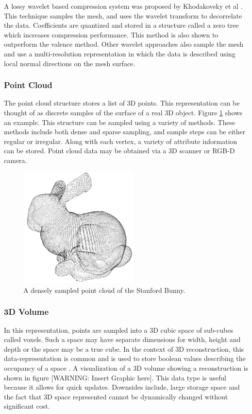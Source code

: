 A lossy wavelet based compression system was proposed by Khodakovsky et al \cite{Khodakovsky00Progressive}. This technique samples the mesh, and uses the wavelet transform to decorrelate the data. Coefficients are quantized and stored in a structure called a zero tree which increases compression performance. This method is also shown to outperform the valence method. Other wavelet approaches \cite{Guskov00Normal,Khodakovsky04Normalmesh} also sample the mesh and use a multi-resolution representation in which the data is described using local normal directions on the mesh surface. \\


\subsubsection{Point Cloud}

The point cloud structure stores a list of 3D points. This representation can be thought of as discrete samples of the surface of a real 3D object. Figure \ref{PointCloudExample} shows an example. This structure can be sampled using a variety of methods. These methods include both dense and sparse sampling, and sample steps can be either regular or irregular. Along with each vertex, a variety of attribute information can be stored. Point cloud data may be obtained via a 3D scanner or RGB-D camera. 

\begin{figure}[!h]
\centering
\includegraphics[width=6cm]{images/ch2/PointCloudExample}
\caption{A densely sampled point cloud of the Stanford Bunny.}
\label{PointCloudExample}
\end{figure}


\subsubsection{3D Volume}

In this representation, points are sampled into a 3D cubic space of sub-cubes called voxels. Such a space may have separate dimensions for width, height and depth or the space may be a true cube. In the context of 3D reconstruction, this data-representation is common and is used to store boolean values describing the occupancy of a space \cite{Rusinkiewicz02Real}. A visualization of a 3D volume showing a reconstruction is shown in figure [WARNING: Insert Graphic here]. This data type is useful because it allows for quick updates. Downsides include, large storage space and the fact that 3D space represented cannot be dynamically changed without significant cost. \\


